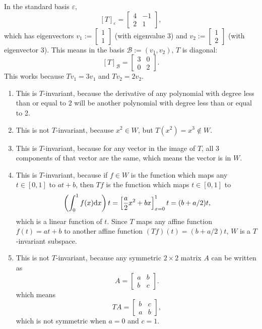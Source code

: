 \documentclass{article}
\begin{document}
\bigskip
\par
\begin{prob}
\end{prob}
In the standard basis $\varepsilon$,
\[ [T]_\varepsilon = \begin{bmatrix}
    4 & -1 \\
    2 & 1
\end{bmatrix}, \]
which has eigenvectors $ v_1 := \begin{bmatrix}
    1 \\
    1
\end{bmatrix}$ (with eigenvalue 3) and $ v_2 := \begin{bmatrix}
    1 \\
    2
\end{bmatrix}$ (with eigenvector 3). This means in the basis $\mathcal{B} := (v_1, v_2)$, $T$ is diagonal:
\[ [T]_\mathcal{B} = \begin{bmatrix}
    3 & 0 \\
    0 & 2
\end{bmatrix}. \]
This works because $Tv_1=3v_1$ and $Tv_2=2v_2$.

\bigskip
\par
\begin{prob}
\end{prob}
\begin{enumerate}[label=(\alph*)]
    \item This is $T$-invariant, because the derivative of any polynomial with degree less than or equal to 2 will be another polynomial with degree less than or equal to 2.
    \item This is not $T$-invariant, because $x^2 \in W$, but $T(x^2)=x^3 \not\in W$.
    \item This is $T$-invariant, because for any vector in the image of $T$, all 3 components of that vector are the same, which means the vector is in $W$.
    \item This is $T$-invariant, because if $f\in W$ is the function which maps any $t \in [0,1]$ to $at+b$, then $Tf$ is the function which maps $t \in [0,1]$ to
        \[ \left( \int_0^1 f(x) \mathrm{d} x \right) t = \left[ \frac{a}{2} x^2 + bx \right]_{x=0}^1 t = (b+a/2)t, \]
        which is a linear function of $t$. Since $T$ maps any affine function $f(t)=at+b$ to another affine function $(Tf)(t)=(b+a/2)t$, $W$ is a $T$-invariant subspace.
    \item This is not $T$-invariant, because any symmetric $2 \times 2$ matrix $A$ can be written as
        \[ A = \begin{bmatrix}
            a & b \\
            b & c
        \end{bmatrix}. \]
        which means
        \[ TA = \begin{bmatrix}
            b & c \\
            a & b
        \end{bmatrix}, \]
        which is not symmetric when $a=0$ and $c=1$.
\end{enumerate}



\end{document}
